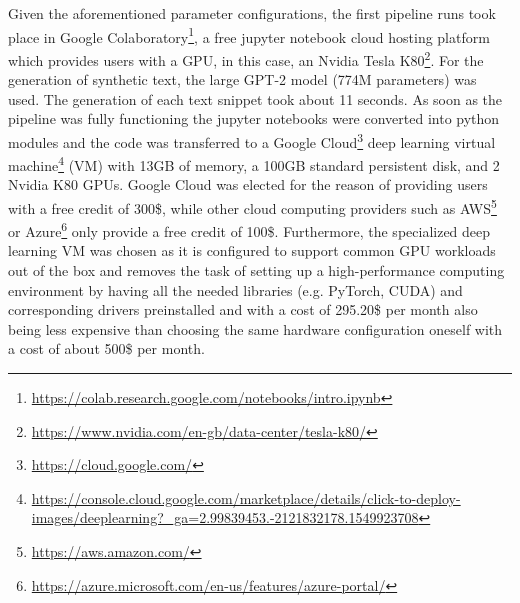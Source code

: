 Given the aforementioned parameter configurations, the first pipeline runs took place in Google Colaboratory\footnote{\url{https://colab.research.google.com/notebooks/intro.ipynb}}, a free jupyter notebook cloud hosting platform which provides users with a GPU, in this case, an Nvidia Tesla K80\footnote{\url{https://www.nvidia.com/en-gb/data-center/tesla-k80/}}. For the generation of synthetic text, the large GPT-2 model (774M parameters) was used. The generation of each text snippet took about 11 seconds. As soon as the pipeline was fully functioning the jupyter notebooks were converted into python modules and the code was transferred to a Google Cloud\footnote{\url{https://cloud.google.com/}} deep learning virtual machine\footnote{\url{https://console.cloud.google.com/marketplace/details/click-to-deploy-images/deeplearning?_ga=2.99839453.-2121832178.1549923708}} (VM) with 13GB of memory, a 100GB standard persistent disk, and 2 Nvidia K80 GPUs. Google Cloud was elected for the reason of providing users with a free credit of 300\$, while other cloud computing providers such as AWS\footnote{\url{https://aws.amazon.com/}} or Azure\footnote{\url{https://azure.microsoft.com/en-us/features/azure-portal/}} only provide a free credit of 100\$. Furthermore, the specialized deep learning VM was chosen as it is configured to support common GPU workloads out of the box and removes the task of setting up a high-performance computing environment by having all the needed libraries (e.g. PyTorch, CUDA) and corresponding drivers preinstalled and with a cost of 295.20\$ per month also being less expensive than choosing the same hardware configuration oneself with a cost of about 500\$ per month.

